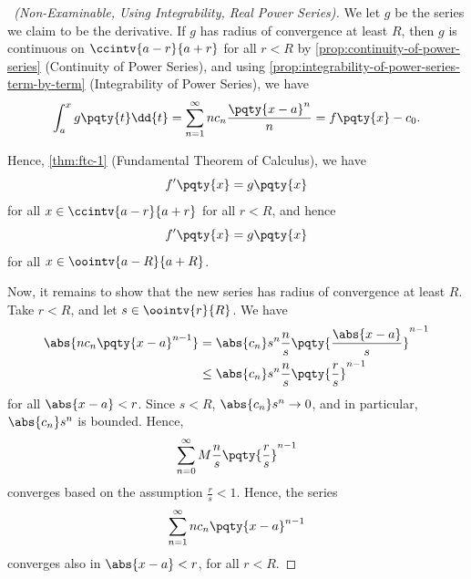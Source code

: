 \begin{proof}[\proofname\ (Non-Examinable, Using Integrability, Real Power Series)]
    We let \(g\) be the series we claim to be the derivative. If \(g\) has radius of convergence at least \(R\), then \(g\) is continuous on \(\ccintv{a - r}{a + r}\) for all \(r < R\) by \autoref{prop:continuity-of-power-series} (Continuity of Power Series), and using \autoref{prop:integrability-of-power-series-term-by-term} (Integrability of Power Series), we have
    \[
        \int_{a}^{x} g\pqty{t} \dd{t} = \sum_{n = 1}^{\infty} n c_n \frac{\pqty{x - a}^{n}}{n} = f\pqty{x} - c_0.
    \]

    Hence, \autoref{thm:ftc-1} (Fundamental Theorem of Calculus), we have
    \[
        f'\pqty{x} = g\pqty{x}
    \]
    for all \(x \in \ccintv{a - r}{a + r}\) for all \(r < R\), and hence
    \[
        f'\pqty{x} = g\pqty{x}
    \]
    for all \(x \in \oointv{a - R}{a + R}\).

    Now, it remains to show that the new series has radius of convergence at least \(R\). Take \(r < R\), and let \(s \in \oointv{r}{R}\). We have
    \begin{align*}
        \abs{n c_n \pqty{x - a}^{n - 1}} &= \abs{c_n} s^n \frac{n}{s} \pqty{\frac{\abs{x - a}}{s}}^{n - 1} \\
        &\leq \abs{c_n} s^n \frac{n}{s} \pqty{\frac{r}{s}}^{n - 1}
    \end{align*}
    for all \(\abs{x - a} < r\). Since \(s < R\), \(\abs{c_n} s^n \to 0\), and in particular, \(\abs{c_n} s^n\) is bounded. Hence,
    \[
        \sum_{n = 0}^{\infty} M \frac{n}{s} \pqty{\frac{r}{s}}^{n - 1}
    \]
    converges based on the assumption \(\frac{r}{s} < 1\). Hence, the series
    \[
        \sum_{n = 1}^{\infty} n c_n \pqty{x - a}^{n - 1}
    \]
    converges also in \(\abs{x - a} < r\), for all \(r < R\).
\end{proof}

